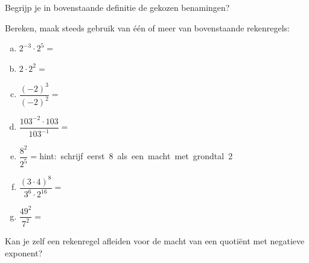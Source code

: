 \documentclass[12pt,twoside]{article}
\begin{document}
\begin{oefening}
Begrijp je in bovenstaande definitie de gekozen benamingen?
\end{oefening}

\begin{oefening}
Bereken, maak steeds gebruik van één of meer van bovenstaande rekenregels:
\begin{enumerate}[(a)]
  \itemsep1em
  \item $2^{-3}\cdot2^5=$\arulefill
  \item $2\cdot 2^2=$\arulefill
  \item $\dfrac{(-2)^3}{(-2)^2}=$\arulefill
  \item $\dfrac{103^{-2}\cdot 103}{103^{-1}}=$\arulefill
  \item $\dfrac{8^2}{2^5}=$\arulefill\mbox{hint: schrijf eerst 8 als een macht met grondtal 2}
  \item $\dfrac{\left(3\cdot4\right)^8}{3^6\cdot 2^{16}}=$\arulefill
  \item $\dfrac{49^2}{7^2}=$\arulefill
\end{enumerate}
\end{oefening}

\begin{oefening}
Kan je zelf een rekenregel afleiden voor de macht van een quotiënt met negatieve exponent?
\end{oefening}

\end{document}
